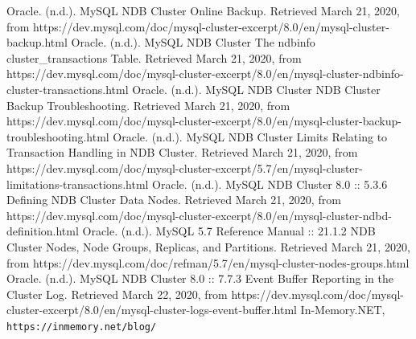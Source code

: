 \documentclass{acmart}
\begin{document}
\begin{thebibliography}{99}
	 Oracle. (n.d.). MySQL NDB Cluster Online Backup. Retrieved March 21, 2020, from https://dev.mysql.com/doc/mysql-cluster-excerpt/8.0/en/mysql-cluster-backup.html
	 Oracle. (n.d.). MySQL NDB Cluster The ndbinfo cluster\_transactions Table. Retrieved March 21, 2020, from https://dev.mysql.com/doc/mysql-cluster-excerpt/8.0/en/mysql-cluster-ndbinfo-cluster-transactions.html
	 Oracle. (n.d.). MySQL NDB Cluster NDB Cluster Backup Troubleshooting. Retrieved March 21, 2020, from https://dev.mysql.com/doc/mysql-cluster-excerpt/8.0/en/mysql-cluster-backup-troubleshooting.html
	 Oracle. (n.d.). MySQL NDB Cluster Limits Relating to Transaction Handling in NDB Cluster. Retrieved March 21, 2020, from https://dev.mysql.com/doc/mysql-cluster-excerpt/5.7/en/mysql-cluster-limitations-transactions.html
	 Oracle. (n.d.). MySQL NDB Cluster 8.0 :: 5.3.6 Defining NDB Cluster Data Nodes. Retrieved March 21, 2020, from https://dev.mysql.com/doc/mysql-cluster-excerpt/8.0/en/mysql-cluster-ndbd-definition.html
	 Oracle. (n.d.). MySQL 5.7 Reference Manual :: 21.1.2 NDB Cluster Nodes, Node Groups, Replicas, and Partitions. Retrieved March 21, 2020, from https://dev.mysql.com/doc/refman/5.7/en/mysql-cluster-nodes-groups.html
	 Oracle. (n.d.). MySQL NDB Cluster 8.0 :: 7.7.3 Event Buffer Reporting in the Cluster Log. Retrieved March 22, 2020, from https://dev.mysql.com/doc/mysql-cluster-excerpt/8.0/en/mysql-cluster-logs-event-buffer.html
	In-Memory.NET,
	\\\texttt{https://inmemory.net/blog/}

\end{thebibliography}
\end{document}
